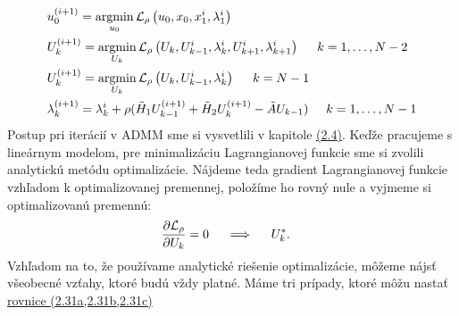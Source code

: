 \begin{subequations}
	\begin{align}
	&u_{0}^{(i+1)} = \operatorname*{argmin}_{u_{0}} \mathcal{L}_{\rho} \left(u_{0},x_{0},x_{1}^{i},\lambda_{1}^{i}\right)\\
	&U_{k}^{(i+1)} = \operatorname*{argmin}_{U_{k}} \mathcal{L}_{\rho} \left(U_{k},U_{k-1}^{i},\lambda_{k}^{i},U_{k+1}^{i},\lambda_{k+1}^{i}\right) \hspace{0.5cm} k=1,\dots,N-2\\
	&U_{k}^{(i+1)} = \operatorname*{argmin}_{U_{k}} \mathcal{L}_{\rho}\left(U_{k},U_{k-1}^{i},\lambda_{k}^{i}\right) \hspace{0.5cm} k=N-1\\
	&\lambda_{k}^{(i+1)} = \lambda_{k}^{i} + \rho( \tilde{H}_{1}U_{k-1}^{(i+1)} + \tilde{H}_{2}U_{k}^{(i+1)} - \tilde{A}U_{k-1})\hspace{0.5cm} k=1,\dots,N-1
	\end{align}
\end{subequations}
Postup pri iterácií v ADMM sme si vysvetlili v kapitole \hyperref[subse:ADMM2]{(2.4)}. Keďže pracujeme s lineárnym modelom, pre minimalizáciu Lagrangianovej funkcie sme si zvolili analytickú metódu optimalizácie. Nájdeme teda gradient Lagrangianovej funkcie vzhľadom k optimalizovanej premennej, položíme ho rovný nule a vyjmeme si optimalizovanú premennú:
\begin{align}
&\frac{\partial \mathcal{L}_{\rho}}{\partial U_{k}} = 0  \hspace{0.5cm} \Longrightarrow  \hspace{0.5cm} U_{k}^{*}.
\end{align}
Vzhľadom na to, že používame analytické riešenie optimalizácie, môžeme nájsť všeobecné vzťahy, ktoré budú vždy platné.
Máme tri prípady, ktoré môžu nastať \hyperref[math:Linear_Lagrangean]{rovnice (2.31a,2.31b,2.31c)}
